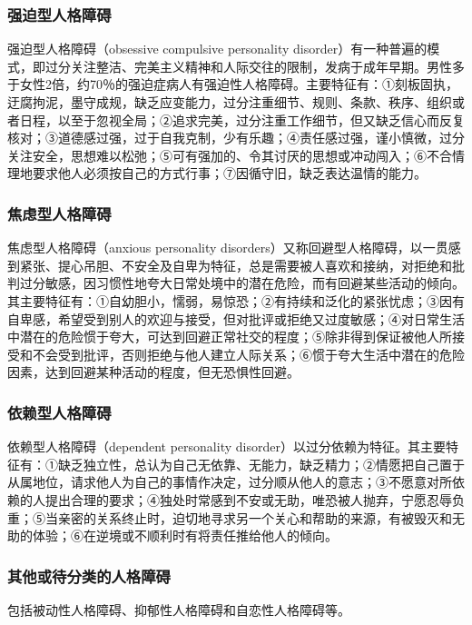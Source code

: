 \subsubsection{强迫型人格障碍}

强迫型人格障碍（obsessive compulsive personality
disorder）有一种普遍的模式，即过分关注整洁、完美主义精神和人际交往的限制，发病于成年早期。男性多于女性2倍，约70％的强迫症病人有强迫性人格障碍。主要特征有：①刻板固执，迂腐拘泥，墨守成规，缺乏应变能力，过分注重细节、规则、条款、秩序、组织或者日程，以至于忽视全局；②追求完美，过分注重工作细节，但又缺乏信心而反复核对；③道德感过强，过于自我克制，少有乐趣；④责任感过强，谨小慎微，过分关注安全，思想难以松弛；⑤可有强加的、令其讨厌的思想或冲动闯入；⑥不合情理地要求他人必须按自己的方式行事；⑦因循守旧，缺乏表达温情的能力。

\subsubsection{焦虑型人格障碍}

焦虑型人格障碍（anxious personality
disorders）又称回避型人格障碍，以一贯感到紧张、提心吊胆、不安全及自卑为特征，总是需要被人喜欢和接纳，对拒绝和批判过分敏感，因习惯性地夸大日常处境中的潜在危险，而有回避某些活动的倾向。其主要特征有：①自幼胆小，懦弱，易惊恐；②有持续和泛化的紧张忧虑；③因有自卑感，希望受到别人的欢迎与接受，但对批评或拒绝又过度敏感；④对日常生活中潜在的危险惯于夸大，可达到回避正常社交的程度；⑤除非得到保证被他人所接受和不会受到批评，否则拒绝与他人建立人际关系；⑥惯于夸大生活中潜在的危险因素，达到回避某种活动的程度，但无恐惧性回避。

\subsubsection{依赖型人格障碍}

依赖型人格障碍（dependent personality
disorder）以过分依赖为特征。其主要特征有：①缺乏独立性，总认为自己无依靠、无能力，缺乏精力；②情愿把自己置于从属地位，请求他人为自己的事情作决定，过分顺从他人的意志；③不愿意对所依赖的人提出合理的要求；④独处时常感到不安或无助，唯恐被人抛弃，宁愿忍辱负重；⑤当亲密的关系终止时，迫切地寻求另一个关心和帮助的来源，有被毁灭和无助的体验；⑥在逆境或不顺利时有将责任推给他人的倾向。

\subsubsection{其他或待分类的人格障碍}

包括被动性人格障碍、抑郁性人格障碍和自恋性人格障碍等。

